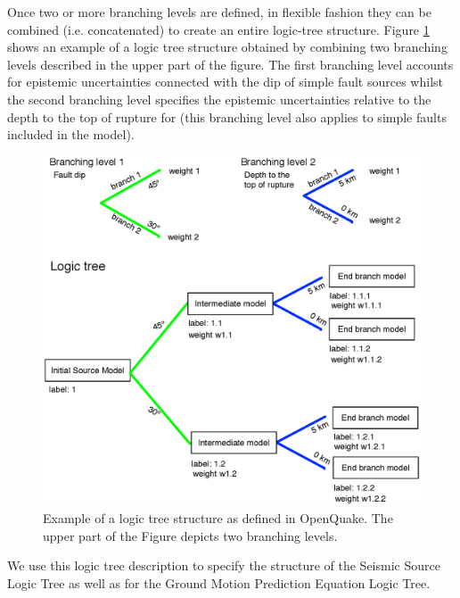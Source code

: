 %
Once two or more branching levels are defined, in flexible fashion they can be  combined (i.e. concatenated) to create an entire logic-tree structure.
Figure \ref{fig:logic_tree_schema} shows an example of a logic tree structure 
obtained by combining two branching levels described  in the upper part of the figure. The first branching level accounts for epistemic uncertainties connected with the dip of simple fault sources whilst the second branching level specifies the epistemic uncertainties relative to the depth to the top of rupture for (this branching level also applies to simple faults included in the model).
%
\begin{figure}
\includegraphics[width=15cm]{./Figures/Part_Hazard/logic_tree_schema.eps}
\caption{Example of a logic tree structure as defined in OpenQuake. The upper
part of the Figure depicts two branching levels.}
\label{fig:logic_tree_schema}
\end{figure}
%
We use this logic tree description to specify the structure of the Seismic Source Logic Tree as well as for the Ground Motion Prediction Equation Logic Tree. 


